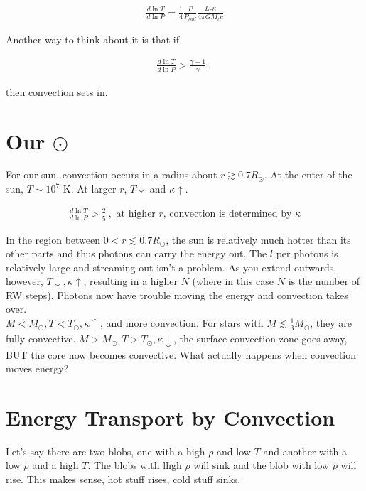 \documentclass[10pt,letterpaper,final]{book}
\begin{document}
\begin{align}
\boxed{\frac{d \ln T}{d \ln P} = \frac{1}{4} \frac{P}{P_{rad}} \frac{L_r \kappa}{4 \pi GM_rc}}
\end{align}

Another way to think about it is that if 

\begin{align}
\frac{d \ln T}{d \ln P} > \frac{\gamma -1}{\gamma}~,
\end{align}

then convection sets in.

\section{Our $\odot$}

For our sun, convection occurs in a radius about $r \gtrsim 0.7 R_\odot$. At the enter of the sun, $T\sim 10^7$ K. At larger $r$, $T \downarrow$ and $\kappa \uparrow$. 

\begin{align}
\frac{d \ln T}{d \ln P} > \frac{2}{5}~,\text{ at higher $r$, convection is determined by $\kappa$}
\end{align}

In the region between $0 < r \lesssim 0.7R_\odot$, the sun is relatively much hotter than its other parts and thus photons can carry the energy out. The $l$ per photons is relatively large and streaming out isn't a problem. As you extend outwards, however, $T \downarrow, \kappa \uparrow$, resulting in a higher $N$ (where in this case $N$ is the number of RW steps). Photons now have trouble moving the energy and convection takes over. \\

$M < M_\odot, T < T_\odot, \kappa \uparrow$, and more convection. For stars with $M \lesssim \frac{1}{3}M_\odot$, they are fully convective. $M > M_\odot, T > T_\odot, \kappa \downarrow$, the surface convection zone goes away, BUT the core now becomes convective. What actually happens when convection moves energy?

\section{Energy Transport by Convection}

Let's say there are two blobs, one with a high $\rho$ and low $T$ and another with a low $\rho$ and a high $T$. The blobs with lhgh $\rho$ will sink and the blob with low $\rho$ will rise. This makes sense, hot stuff rises, cold stuff sinks. 
\end{document}
